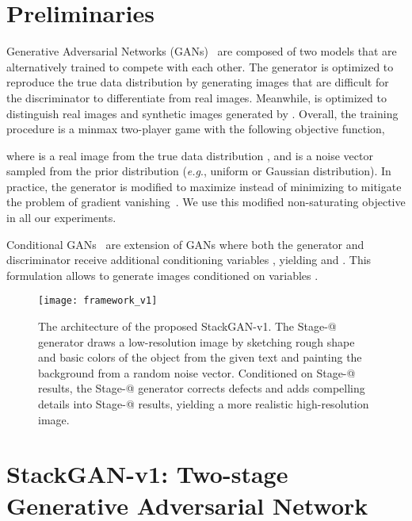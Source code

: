 \documentclass[10pt,journal,letterpaper,compsoc]{IEEEtran}
\makeatletter
\newcommand{\Rmnum}[1]{\expandafter\@slowromancap\romannumeral #1@}
\makeatother
\begin{document}
\section{Preliminaries}\label{sec:bg}
{
Generative Adversarial Networks (GANs)~\cite{goodfellow2014generative} are composed of two models that are alternatively trained to compete with each other. The generator  is optimized to reproduce the true data distribution  by generating images that are difficult for the discriminator  to differentiate from real images. Meanwhile,  is optimized to distinguish real images and synthetic images generated by . Overall, the training procedure is a minmax two-player game with the following objective function, 

where  is a real image from the true data distribution , and  is a noise vector sampled from the prior distribution  (\emph{e.g}., uniform or Gaussian distribution). In practice, the generator  is modified to maximize  instead of minimizing  to mitigate the problem of gradient vanishing~\cite{goodfellow2014generative}. We use this modified non-saturating objective in all our experiments. 


Conditional GANs~\cite{gauthier2015conditional, Mirza14} are extension of GANs where both the generator and discriminator receive additional conditioning variables , yielding  and . This formulation allows  to generate images conditioned on variables . 
}


\begin{figure*}[tb]
\begin{center}
\texttt{[image: framework\_v1]}
\end{center}
 \vspace{-5pt}
   \caption{The architecture of the proposed StackGAN-v1. The Stage-\Rmnum{1} generator draws a low-resolution image by sketching rough shape and basic colors of the object from the given text and painting the background from a random noise vector. Conditioned on Stage-\Rmnum{1} results, the Stage-\Rmnum{2} generator corrects defects and adds compelling details into Stage-\Rmnum{1} results, yielding a more realistic high-resolution image.
   }
	\vspace{-10pt}
\label{fig:StackGAN-v1}
\end{figure*}





\section{StackGAN-v1: Two-stage Generative Adversarial Network}\label{sec:v1}
\end{document}

